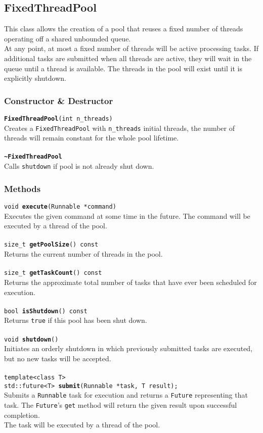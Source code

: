 \documentclass[10pt,twocolumn,letterpaper]{article}
\begin{document}
	\subsection{FixedThreadPool}\label{sec:ftp}
	\noindent
	This class allows the creation of a pool that reuses a fixed number of threads operating off a shared unbounded queue.\\
	At any point, at most a fixed number of threads will be active processing tasks.
	If additional tasks are submitted when all threads are active, they will wait in the queue until a thread is available.
	The threads in the pool will exist until it is explicitly shutdown.
	\subsubsection{Constructor \& Destructor}
	\texttt{\textbf{FixedThreadPool}(int n\_threads)}\\
	Creates a \lstinline|FixedThreadPool| with \lstinline|n_threads| initial threads, the number of threads will remain constant for the whole pool lifetime.\\\\
	\texttt{\textbf{\textasciitilde FixedThreadPool}}\\
	Calls \texttt{shutdown} if pool is not already shut down.
	\subsubsection{Methods}
	\texttt{void \textbf{execute}(Runnable *command)}\\
	Executes the given command at some time in the future. The command will be executed by a thread of the pool.\\\\
	\texttt{size\_t \textbf{getPoolSize}() const}\\
	Returns the current number of threads in the pool.\\\\
	\texttt{size\_t \textbf{getTaskCount}() const}\\
	Returns the approximate total number of tasks that have ever been scheduled for execution.\\\\
	\texttt{bool \textbf{isShutdown}() const}\\
	Returns \texttt{true} if this pool has been shut down.\\\\
	\texttt{void \textbf{shutdown}()}\\
	Initiates an orderly shutdown in which previously submitted tasks are executed, but no new tasks will be accepted.\\\\
	\texttt{template<class T>\\
		std::future<T> \textbf{submit}(Runnable *task, T result);}\\
	Submits a \lstinline|Runnable| task for execution and returns a \lstinline|Future| representing that task. The \lstinline|Future|'s \lstinline|get| method will return the given result upon successful completion.\\
	The task will be executed by a thread of the pool.
	
\end{document}

